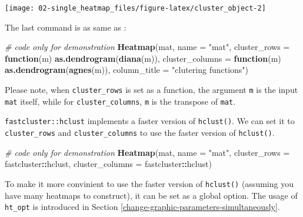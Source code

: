 \documentclass[]{book}
\newenvironment{Shaded}{\begin{snugshade}}{\end{snugshade}}
\newcommand{\KeywordTok}[1]{\textcolor[rgb]{0.13,0.29,0.53}{\textbf{#1}}}
\newcommand{\DataTypeTok}[1]{\textcolor[rgb]{0.13,0.29,0.53}{#1}}
\newcommand{\StringTok}[1]{\textcolor[rgb]{0.31,0.60,0.02}{#1}}
\newcommand{\CommentTok}[1]{\textcolor[rgb]{0.56,0.35,0.01}{\textit{#1}}}
\newcommand{\OtherTok}[1]{\textcolor[rgb]{0.56,0.35,0.01}{#1}}
\newcommand{\ControlFlowTok}[1]{\textcolor[rgb]{0.13,0.29,0.53}{\textbf{#1}}}
\newcommand{\OperatorTok}[1]{\textcolor[rgb]{0.81,0.36,0.00}{\textbf{#1}}}
\newcommand{\NormalTok}[1]{#1}
\theoremstyle{definition}
\theoremstyle{definition}
\theoremstyle{definition}
\theoremstyle{remark}
\begin{document}
\begin{center}\texttt{[image: 02-single\_heatmap\_files/figure-latex/cluster\_object-2]} \end{center}

The last command is as same as :

\begin{Shaded}
\begin{Highlighting}[]
\CommentTok{# code only for demonstration}
\KeywordTok{Heatmap}\NormalTok{(mat, }\DataTypeTok{name =} \StringTok{"mat"}\NormalTok{, }\DataTypeTok{cluster_rows =} \ControlFlowTok{function}\NormalTok{(m) }\KeywordTok{as.dendrogram}\NormalTok{(}\KeywordTok{diana}\NormalTok{(m)),}
    \DataTypeTok{cluster_columns =} \ControlFlowTok{function}\NormalTok{(m) }\KeywordTok{as.dendrogram}\NormalTok{(}\KeywordTok{agnes}\NormalTok{(m)), }\DataTypeTok{column_title =} \StringTok{"clutering functions"}\NormalTok{)}
\end{Highlighting}
\end{Shaded}

Please note, when \texttt{cluster\_rows} is set as a function, the
argument \texttt{m} is the input \texttt{mat} itself, while for
\texttt{cluster\_columns}, \texttt{m} is the transpose of \texttt{mat}.

\texttt{fastcluster::hclust} implements a faster version of
\texttt{hclust()}. We can set it to \texttt{cluster\_rows} and
\texttt{cluster\_columns} to use the faster version of
\texttt{hclust()}.

\begin{Shaded}
\begin{Highlighting}[]
\CommentTok{# code only for demonstration}
\KeywordTok{Heatmap}\NormalTok{(mat, }\DataTypeTok{name =} \StringTok{"mat"}\NormalTok{, }\DataTypeTok{cluster_rows =}\NormalTok{ fastcluster}\OperatorTok{::}\NormalTok{hclust, }
    \DataTypeTok{cluster_columns =}\NormalTok{ fastcluster}\OperatorTok{::}\NormalTok{hclust)}
\end{Highlighting}
\end{Shaded}

To make it more convinient to use the faster version of
\texttt{hclust()} (assuming you have many heatmaps to construct), it can
be set as a global option. The usage of \texttt{ht\_opt} is introduced
in Section \ref{change-graphic-parameters-simultaneously}.

\begin{Shaded}
\end{Shaded}
\end{document}
